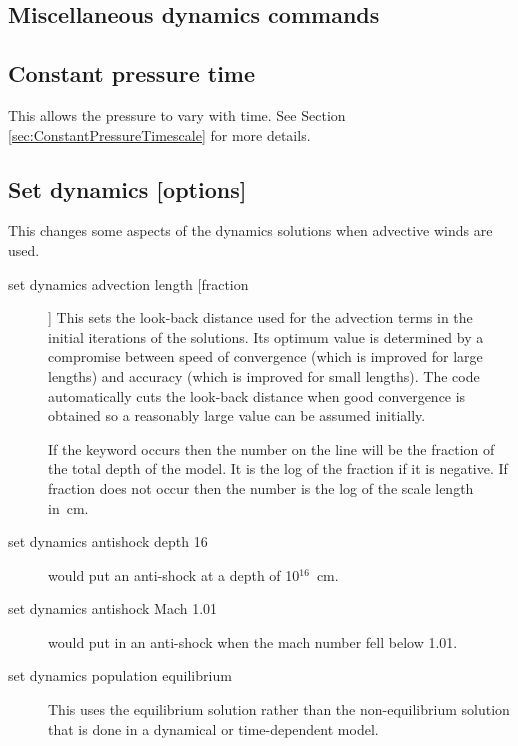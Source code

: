 \begin{shaded}
\section{\experimental Miscellaneous dynamics commands}

\subsection{Constant pressure time}

This allows the pressure to vary with time.
See Section \ref{sec:ConstantPressureTimescale}
for more details.

\subsection{Set dynamics [options]}

This changes some aspects of the dynamics solutions when advective winds
are used.
\begin{description}
\item[set dynamics advection  length [fraction]]  This sets the look-back
distance used for the advection terms in the initial iterations of the
solutions.
Its optimum value is determined by a compromise between speed
of convergence (which is improved for large lengths)
and accuracy (which
is improved for small lengths).
The code automatically cuts the look-back
distance when good convergence is obtained so a reasonably large
value can be assumed initially.

If the keyword  occurs then the
number on the line will be the
fraction of the total depth of the model.
It is the log of the fraction
if it is negative.
If fraction does not occur then the number is the log
of the scale length in~cm.

\item[set dynamics antishock depth 16] would put an
anti-shock at a depth of 10$^{16}$~cm.

\item[set dynamics antishock Mach 1.01] would put in
an anti-shock when the
mach number fell below 1.01.

\item[set dynamics population equilibrium]
This uses the equilibrium solution rather than the non-equilibrium
solution that is done in a dynamical or time-dependent model.


\end{description}
\end{shaded}
